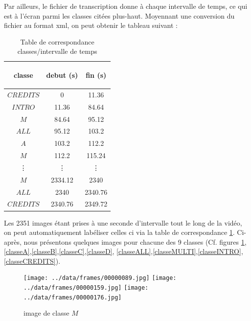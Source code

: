 \documentclass{book}
\begin{document}
Par ailleurs, le fichier de transcription donne à chaque intervalle de temps, ce qui est à l'écran parmi les classes citées plus-haut. 
Moyennant une conversion du fichier au format xml, on peut obtenir le tableau suivant :

\begin{table}[H]
\begin{center}
\begin{tabular}{|c|c|c|}
\hline
\begin{bf}classe\end{bf} & \begin{bf}debut (s)\end{bf} & \begin{bf}fin (s)\end{bf} \\
\hline
$CREDITS$	& 0 & 11.36 \\
\hline
$INTRO$   & 11.36	& 84.64 \\
\hline
$M$	& 84.64	& 95.12 \\
\hline
$ALL$	& 95.12	& 103.2 \\
\hline
$A$	& 103.2	& 112.2 \\
\hline
$M$	& 112.2	& 115.24 \\
\hline
\vdots & \vdots &\vdots \\
\hline
$M$	& 2334.12 & 2340 \\
\hline
$ALL$	& 2340 & 2340.76 \\
\hline
$CREDITS$	& 2340.76 & 2349.72 \\
\hline
\end{tabular}
\end{center}
\caption{Table de correspondance classes/intervalle de temps}
\label{Table correspondance classe/temps}
\end{table}
\clearpage

Les 2351 images étant prises à une seconde d'intervalle tout le long de la vidéo, on peut automatiquement labéliser celles ci via la table de
correspondance \ref{Table correspondance classe/temps}.
Ci-après, nous présentons quelques images pour chacune des 9 classes (Cf. figures \ref{classeM},\ref{classeA},\ref{classeB},\ref{classeC},\ref{classeD},
\ref{classeALL},\ref{classeMULTI},\ref{classeINTRO},\ref{classeCREDITS}).
\begin{figure}[H]
\begin{center}
\texttt{[image: ../data/frames/00000089.jpg]}
\texttt{[image: ../data/frames/00000159.jpg]}
\texttt{[image: ../data/frames/00000176.jpg]}
\end{center}
\caption{image de classe $M$}
\label{classeM}
\end{figure}
\end{document}
